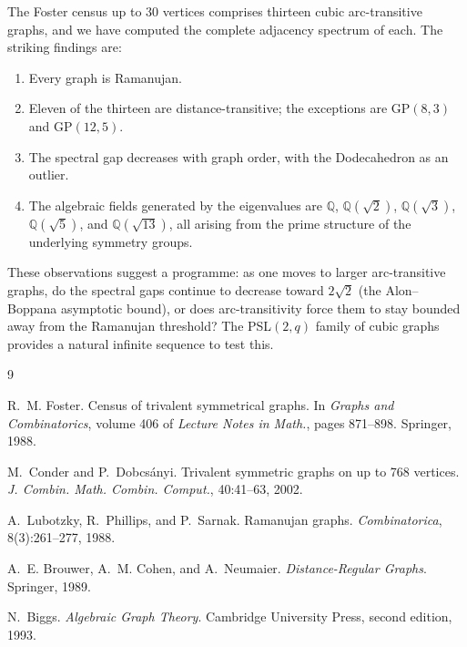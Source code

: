 \documentclass[11pt,a4paper]{article}
\begin{document}
The Foster census up to 30 vertices comprises thirteen cubic arc-transitive graphs, and we have computed the complete adjacency spectrum of each. The striking findings are:
\begin{enumerate}
\item Every graph is Ramanujan.
\item Eleven of the thirteen are distance-transitive; the exceptions are $\mathrm{GP}(8,3)$ and $\mathrm{GP}(12,5)$.
\item The spectral gap decreases with graph order, with the Dodecahedron as an outlier.
\item The algebraic fields generated by the eigenvalues are $\mathbb{Q}$, $\mathbb{Q}(\sqrt{2})$, $\mathbb{Q}(\sqrt{3})$, $\mathbb{Q}(\sqrt{5})$, and $\mathbb{Q}(\sqrt{13})$, all arising from the prime structure of the underlying symmetry groups.
\end{enumerate}

These observations suggest a programme: as one moves to larger arc-transitive graphs, do the spectral gaps continue to decrease toward $2\sqrt{2}$ (the Alon--Boppana asymptotic bound), or does arc-transitivity force them to stay bounded away from the Ramanujan threshold? The PSL$(2,q)$ family of cubic graphs provides a natural infinite sequence to test this.

\begin{thebibliography}{9}

R.~M. Foster.
\newblock Census of trivalent symmetrical graphs.
\newblock In \emph{Graphs and Combinatorics}, volume 406 of \emph{Lecture Notes in Math.}, pages 871--898. Springer, 1988.

M.~Conder and P.~Dobcs\'{a}nyi.
\newblock Trivalent symmetric graphs on up to 768 vertices.
\newblock \emph{J. Combin. Math. Combin. Comput.}, 40:41--63, 2002.

A.~Lubotzky, R.~Phillips, and P.~Sarnak.
\newblock Ramanujan graphs.
\newblock \emph{Combinatorica}, 8(3):261--277, 1988.

A.~E. Brouwer, A.~M. Cohen, and A.~Neumaier.
\newblock \emph{Distance-Regular Graphs}.
\newblock Springer, 1989.

N.~Biggs.
\newblock \emph{Algebraic Graph Theory}.
\newblock Cambridge University Press, second edition, 1993.

\end{thebibliography}
\end{document}
